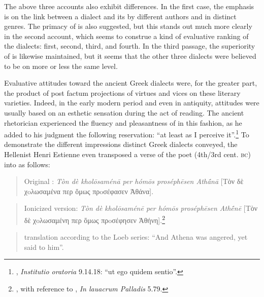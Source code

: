 The above three accounts also exhibit differences. In the first case, the emphasis is on the link between a dialect and its  by different authors and in distinct genres. The primacy of  is also suggested, but this stands out much more clearly in the second account, which seems to construe a kind of evaluative ranking of the dialects:  first,  second,  third, and  fourth. In the third passage, the superiority of  is likewise maintained, but it seems that the other three dialects were believed to be on more or less the same level.

Evaluative attitudes toward the ancient Greek dialects were, for the greater part, the product of post factum projections of virtues and vices on these literary varieties. Indeed, in the early modern period and even in antiquity, attitudes were usually based on an esthetic sensation during the act of reading. The ancient  rhetorician  experienced the fluency and pleasantness of  in this fashion, as he added to his judgment the following reservation: “at least as I perceive it”.\footnote{, \textit{Institutio oratoria} 9.14.18: “ut ego quidem sentio”.} To demonstrate the different impressions distinct Greek dialects conveyed, the  Hellenist Henri Estienne even transposed a  verse of the  poet  (4th/3rd cent. \textsc{bc}) into  as follows:

\begin{quote}
Original : \textit{Tòn dè kholōsaménā per hómōs proséphēsen Athā́nā} [Tὸν δὲ χoλωσαμένα περ ὅμως πρoσέφασεν Ἀθάνα].
\end{quote}

\begin{quote}
Ionicized version: \textit{Tòn dè kholōsaménē per hómōs proséphēsen Athḗnē} [Tὸν δὲ χoλωσαμένη περ ὅμως πρoσέφησεν Ἀθήνη].\footnote{\citet[15--16]{Estienne1581}, with reference to , \textit{In lauacrum Palladis} 5.79.}
\end{quote}

\begin{quote}
 translation according to the Loeb series: “And Athena was angered, yet said to him”.
\end{quote}

